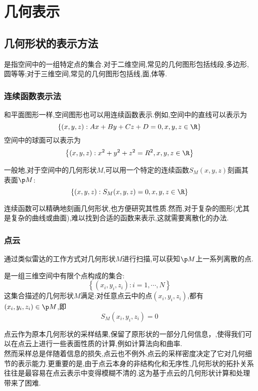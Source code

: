 \documentclass{ctexart}
\begin{document}
\section{几何表示}
\subsection{几何形状的表示方法}
是指空间中的一组特定点的集合.对于二维空间,常见的几何图形包括线段,多边形,圆等等;对于三维空间,常见的几何图形包括线,面,体等.
\subsubsection{连续函数表示法}
和平面图形一样,空间图形也可以用连续函数表示.例如,空间中的直线可以表示为
\[\left\{(x,y,z):Ax+By+Cz+D=0,x,y,z\in\R\right\}\]
空间中的球面可以表示为
\[\left\{(x,y,z):x^2+y^2+z^2=R^2,x,y,z\in\R\right\}\]
\begin{definition}[连续函数表示法]
    一般地,对于空间中的几何形状$M$,可以用一个特定的连续函数$S_{M}(x,y,z)$刻画其表面$\p M$:
    \[\left\{(x,y,z):S_M(x,y,z)=0,x,y,z\in\R\right\}\]
\end{definition}
连续函数可以精确地刻画几何形状,也方便研究其性质.然而,对于复杂的图形(尤其是复杂的曲线或曲面),难以找到合适的函数来表示,这就需要离散化的办法.
\subsubsection{点云}
通过类似雷达的工作方式对几何形状$M$进行扫描,可以获知$\p M$上一系列离散的点.
\begin{definition}[点云]
    是一组三维空间中有限个点构成的集合:
    \[\left\{\left(x_i,y_i,z_i\right):i=1,\cdots,N\right\}\]
    这集合描述的几何形状$M$满足:对任意点云中的点$\left(x_i,y_i,z_i\right)$,都有$\left(x_i,y_i,z_i\right)\in\p M$,即
    \[S_M\left(x_i,y_i,z_i\right)=0\]
\end{definition}
点云作为原本几何形状的采样结果,保留了原形状的一部分几何信息，,使得我们可以在点云上进行一些表面性质的计算,例如计算法向和曲率.\\
\indent 然而采样总是伴随着信息的损失,点云也不例外.点云的采样密度决定了它对几何细节的表示能力.更重要的是,由于点云本身的非结构化和无序性,几何形状的拓扑关系往往是最容易在点云表示中变得模糊不清的.这为基于点云的几何形状计算和处理带来了困难.
\end{document}
